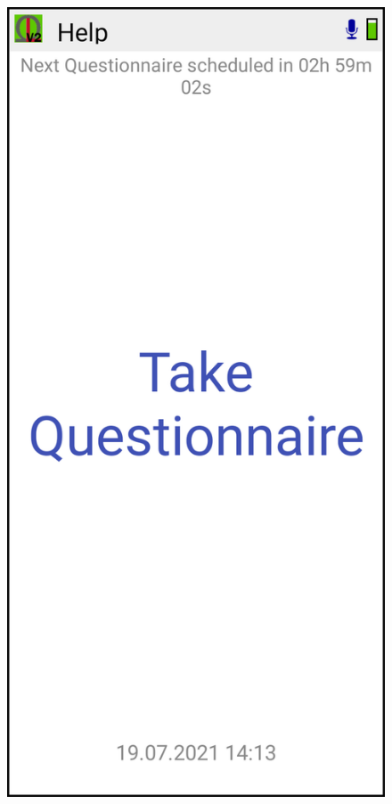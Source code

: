 \documentclass[11pt,a4paper,titlepage]{article}
\begin{document}
\begin{figure}
\vspace{-0.5cm}
		\centering
			\begin{minipage}{0.30\textwidth}
			\includegraphics[width=1.00\textwidth]{images/v2_screen_main_ed.png}
			\label{fig:menu}
			\end{minipage}
	\end{figure}
\end{document}
